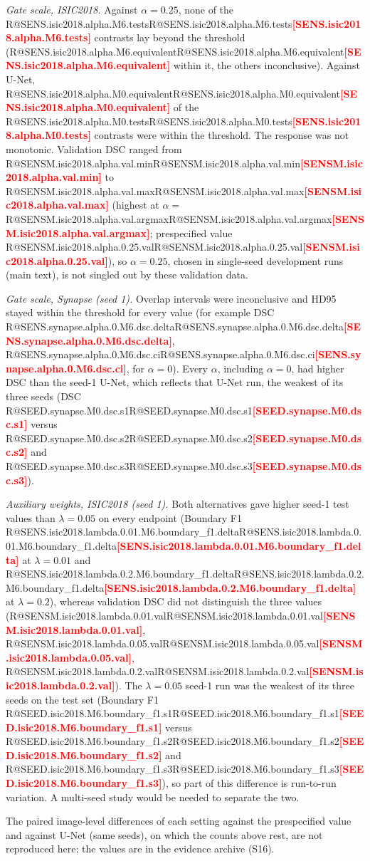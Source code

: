 \documentclass[10pt]{article}
\makeatletter
\newcommand{\R}[1]{\ifcsname R@#1\endcsname\csname R@#1\endcsname\else\textbf{\textcolor{red}{[#1]}}\fi}
\newcommand{\fitwidth}[1]{\sbox{\fitbox}{#1}\ifdim\wd\fitbox>\linewidth\resizebox{\linewidth}{!}{\usebox{\fitbox}}\else\usebox{\fitbox}\fi}
\makeatother
\begin{document}
\emph{Gate scale, ISIC2018.} Against $\alpha=0.25$, none of the \R{SENS.isic2018.alpha.M6.tests} contrasts lay beyond the threshold (\R{SENS.isic2018.alpha.M6.equivalent} within it, the others inconclusive). Against U-Net, \R{SENS.isic2018.alpha.M0.equivalent} of the \R{SENS.isic2018.alpha.M0.tests} contrasts were within the threshold. The response was not monotonic. Validation DSC ranged from \R{SENSM.isic2018.alpha.val.min} to \R{SENSM.isic2018.alpha.val.max} (highest at $\alpha=$\,\R{SENSM.isic2018.alpha.val.argmax}; prespecified value \R{SENSM.isic2018.alpha.0.25.val}), so $\alpha=0.25$, chosen in single-seed development runs (main text), is not singled out by these validation data.

\emph{Gate scale, Synapse (seed 1).} Overlap intervals were inconclusive and HD95 stayed within the threshold for every value (for example DSC \R{SENS.synapse.alpha.0.M6.dsc.delta}, \R{SENS.synapse.alpha.0.M6.dsc.ci}, for $\alpha=0$). Every $\alpha$, including $\alpha=0$, had higher DSC than the seed-1 U-Net, which reflects that U-Net run, the weakest of its three seeds (DSC \R{SEED.synapse.M0.dsc.s1} versus \R{SEED.synapse.M0.dsc.s2} and \R{SEED.synapse.M0.dsc.s3}).

\emph{Auxiliary weights, ISIC2018 (seed 1).} Both alternatives gave higher seed-1 test values than $\lambda=0.05$ on every endpoint (Boundary F1 \R{SENS.isic2018.lambda.0.01.M6.boundary_f1.delta} at $\lambda=0.01$ and \R{SENS.isic2018.lambda.0.2.M6.boundary_f1.delta} at $\lambda=0.2$), whereas validation DSC did not distinguish the three values (\R{SENSM.isic2018.lambda.0.01.val}, \R{SENSM.isic2018.lambda.0.05.val}, \R{SENSM.isic2018.lambda.0.2.val}). The $\lambda=0.05$ seed-1 run was the weakest of its three seeds on the test set (Boundary F1 \R{SEED.isic2018.M6.boundary_f1.s1} versus \R{SEED.isic2018.M6.boundary_f1.s2} and \R{SEED.isic2018.M6.boundary_f1.s3}), so part of this difference is run-to-run variation. A multi-seed study would be needed to separate the two.
\begin{table}[!htbp]\centering
\fitwidth{}
\caption{Validation and test means per setting (presp. = prespecified value). ISIC2018 validation DSC is on the 519 documented validation images; ``--'' where the reference run's validation record is not on the same pipeline.}
\end{table}
The paired image-level differences of each setting against the prespecified value and against U-Net (same seeds), on which the counts above rest, are not reproduced here; the values are in the evidence archive (S16).
\end{document}

